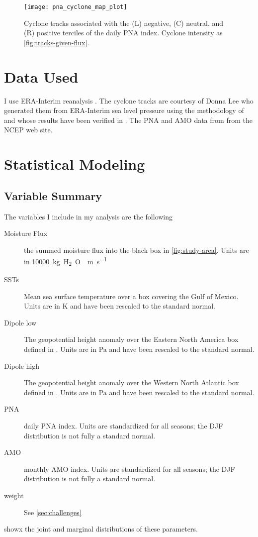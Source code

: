 \documentclass[12pt]{article}
\begin{document}
\begin{figure}
    \centering
    \texttt{[image: pna\_cyclone\_map\_plot]}
    \caption{Cyclone tracks associated with the (L) negative, (C) neutral, and (R) positive terciles of the daily PNA index.  Cyclone intensity as \cref{fig:tracks-given-flux}.}
    \label{fig:tracks-given-pna}
\end{figure}

\section{Data Used}

I use ERA-Interim reanalysis \citep{Dee2011}.
The cyclone tracks are courtesy of Donna Lee who generated them from ERA-Interim sea level pressure using the methodology of \citet{Hodges1994} and whose results have been verified in \cite{Booth2015}.
The PNA and AMO data from from the NCEP web site.

\section{Statistical Modeling}


\subsection{Variable Summary} \label{sec:var-summary}


The variables I include in my analysis are the following
\begin{description}
    \item[Moisture Flux] the summed moisture flux into the black box in \cref{fig:study-area}. Units are in \SI{10000}{\kilo\gram H_2O \per\meter\per\second}
    \item[SSTs] Mean sea surface temperature over a box covering the Gulf of Mexico. Units are in \si{\kelvin} and have been rescaled to the standard normal.
    \item[Dipole low] The geopotential height anomaly over the Eastern North America box defined in \citet{Farnham2016}. Units are in \si{\pascal} and have been rescaled to the standard normal.
    \item[Dipole high] The geopotential height anomaly over the Western North Atlantic box defined in \citet{Farnham2016}. Units are in \si{\pascal} and have been rescaled to the standard normal.
    \item[PNA] daily PNA index. Units are standardized for all seasons; the DJF distribution is not fully a standard normal.
    \item[AMO] monthly AMO index. Units are standardized for all seasons; the DJF distribution is not fully a standard normal.
    \item[weight] See \cref{sec:challenges}
\end{description}
 showx the joint and marginal distributions of these parameters.
\end{document}
